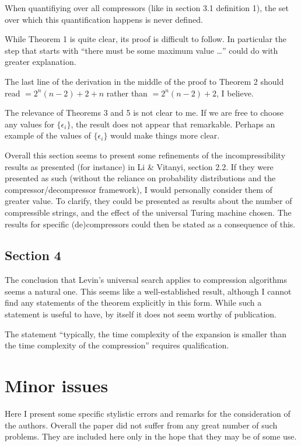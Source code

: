 \documentclass{article}
\theoremstyle{definition}
\begin{document}
When quantifiying over all compressors (like in section 3.1 definition 1), the set over which this quantification happens is never defined.

While Theorem 1 is quite clear, its proof is difficult to follow. In particular the step that starts with ``there must be some maximum value \ldots'' could do with greater explanation.

The last line of the derivation in the middle of the proof to Theorem 2 should read $= 2^n(n-2) + 2 + n$ rather than $= 2^n(n-2) + 2$, I believe.

The relevance of Theorems 3 and 5 is not clear to me. If we are free to choose any values for $\{\epsilon_i\}$, the result does not appear that remarkable. Perhaps an example of the values of $\{\epsilon_i\}$ would make things more clear.

Overall this section seems to present some refinements of the incompressibility results as presented (for instance) in  Li \& Vitanyi, section 2.2. If they were presented as such (without the reliance on probability distributions and the compressor/decompressor framework), I would personally consider them of greater value. To clarify, they could be presented as results about the number of compressible strings, and the effect of the universal Turing machine chosen. The results for specific (de)compressors could then be stated as a consequence of this.

\subsection*{Section 4}

The conclusion that Levin's universal search applies to compression algorithms seems a natural one. This seems like a well-established result, although I cannot find any statements of the theorem explicitly in this form. While such a statement is useful to have, by itself it does not seem worthy of publication.

The statement ``typically, the time complexity of the expansion is smaller than the time complexity of the compression'' requires qualification.

\pagebreak[4]

\section{Minor issues}

Here I present some specific stylistic errors and remarks for the consideration of the authors. Overall the paper did not suffer from any great number of such problems. They are included here only in the hope that they may be of some use.
\end{document}
